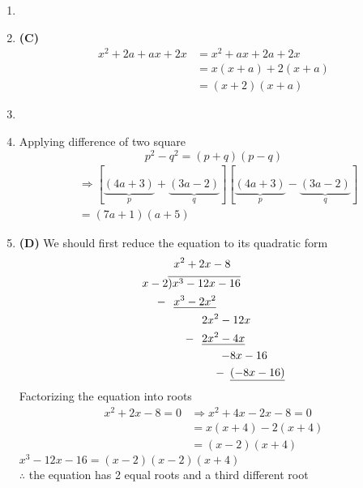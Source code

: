 \begin{multicols}{2}
\begin{enumerate}[label={\textbf{\arabic*.}}]
    \item 
    \item \textbf{(C)} \begin{align*} 
        x^2 + 2a +ax + 2x &= x^2 + ax + 2a + 2x  \\
        & = x ( x + a ) + 2 (x + a) \\
        & = (x + 2)(x+a)
    \end{align*}
    \item 
    \item Applying difference of two square \\ \vspace{-5pt} $$p^2 - q^2 = (p + q)(p-q)$$ 
    \begin{align*}
        &\Rightarrow [\underbrace{(4a + 3)}_{p} + \underbrace{(3a -2)}_{q} ][\underbrace{(4a + 3)}_{p} - \underbrace{(3a -2)}_{q}] \\
        & = (7a + 1)(a + 5)
    \end{align*}
    \item \textbf{(D)} We should first reduce the equation to its quadratic form 
      \begin{align*}
        & \hspace{5pt} x^2 + 2x - 8 \\
        x - 2& \overline{)x^3 - 12x -16 } \\ 
        -\hspace{2pt} & \hspace{5pt}  \underline{x^3 - 2x^2} \\
        & \hspace{30pt} 2x^2 - 12x \\
    - \hspace{-23pt}& \hspace{30pt} \underline{2x^2 - 4x} \\
    -\hspace{-55pt} & \hspace{55pt} 8x - 16 \\
   -\hspace{-50pt} & \hspace{55pt} \underline{(-8x - 16)} \\
    \end{align*} 
    Factorizing the equation into roots 
    \begin{align*} 
        x^2 + 2x - 8 = 0 &\Rightarrow x^2 + 4x - 2x - 8 = 0 \\
        & = x(x+4) -2(x+4)  \\ &= (x-2)(x+4)
    \end{align*} 
    $x^3 - 12x -16 = (x-2)(x-2)(x+4)$ \\
    $\therefore$ the equation has 2 equal roots and a third different root


\end{enumerate}
\end{multicols}
